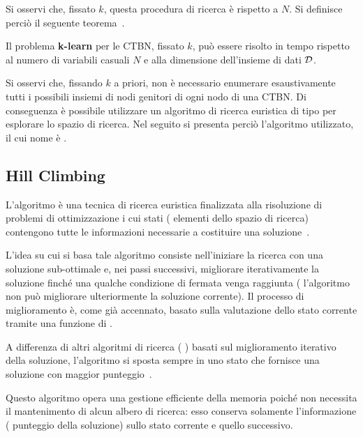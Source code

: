 Si osservi che, fissato $k$, questa procedura di ricerca è  rispetto a $N$. Si definisce perciò il seguente teorema~\citep{Nodelman2002}.
\begin{teorema}
Il problema \textbf{k-learn} per le \acl{CTBN}, fissato $k$, può essere risolto in tempo  rispetto al numero di variabili casuali $N$ e alla dimensione dell'insieme di dati $\mathcal{D}$.
\end{teorema}

Si osservi che, fissando $k$ a priori, non è necessario enumerare esaustivamente tutti i possibili insiemi di nodi genitori di ogni nodo di una \acs{CTBN}. Di conseguenza è possibile utilizzare un algoritmo di ricerca euristica di tipo \emph{} per esplorare lo spazio di ricerca. Nel seguito si presenta perciò l'algoritmo utilizzato, il cui nome è \emph{\keyword{\hc{}}}.

\subsection{Hill Climbing}\label{subsec:structurallearning-hc}
L'algoritmo \emph{\keyword{\hc{}}} è una tecnica di ricerca euristica finalizzata alla risoluzione di problemi di ottimizzazione i cui stati (\ie{} elementi dello spazio di ricerca) contengono tutte le informazioni necessarie a costituire una soluzione~\citep{Russel2003}.

L'idea su cui si basa tale algoritmo consiste nell'iniziare la ricerca con una soluzione sub-ottimale e, nei passi successivi, migliorare iterativamente la soluzione finché una qualche condizione di fermata venga raggiunta (\eg{} l'algoritmo non può migliorare ulteriormente la soluzione corrente). Il processo di miglioramento è, come già accennato, basato sulla valutazione dello stato corrente tramite una funzione di .

A differenza di altri algoritmi di ricerca (\eg{} \emph{}) basati sul miglioramento iterativo della soluzione, l'algoritmo \emph{\keyword{\hc{}}} si sposta sempre in uno stato che fornisce una soluzione con maggior punteggio~\citep{Russel2003}.

\begin{notas}
Questo algoritmo opera una gestione efficiente della memoria poiché non necessita il mantenimento di alcun albero di ricerca: esso conserva solamente l'informazione (\ie{} punteggio della soluzione) sullo stato corrente e quello successivo.
\end{notas}

